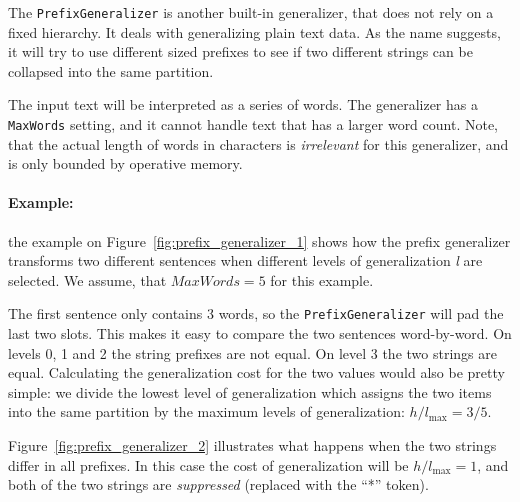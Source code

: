 The \texttt{PrefixGeneralizer} is another built-in generalizer, that does not rely on a fixed hierarchy. It deals with generalizing plain text data. As the name suggests, it will try to use different sized prefixes to see if two different strings can be collapsed into the same partition.

The input text will be interpreted as a series of words. The generalizer has a \texttt{MaxWords} setting, and it cannot handle text that has a larger word count. Note, that the actual length of words in characters is \textit{irrelevant} for this generalizer, and is only bounded by operative memory.

\paragraph{Example:} the example on Figure~\ref{fig:prefix_generalizer_1} shows how the prefix generalizer transforms two different sentences when different levels of generalization \textit{l} are selected. We assume, that \(MaxWords = 5\) for this example.

The first sentence only contains 3 words, so the \texttt{PrefixGeneralizer} will pad the last two slots. This makes it easy to compare the two sentences word-by-word. On levels 0, 1 and 2 the string prefixes are not equal. On level 3 the two strings are equal. Calculating the generalization cost for the two values would also be pretty simple: we divide the lowest level of generalization which assigns the two items into the same partition by the maximum levels of generalization: \(h/l_{\max} = 3/5\).

\vspace{\baselineskip}


Figure~\ref{fig:prefix_generalizer_2} illustrates what happens when the two strings differ in all prefixes. In this case the cost of generalization will be \(h/l_{\max} = 1 \), and both of the two strings are \textit{suppressed} (replaced with the ``*'' token).

\vspace{\baselineskip}
